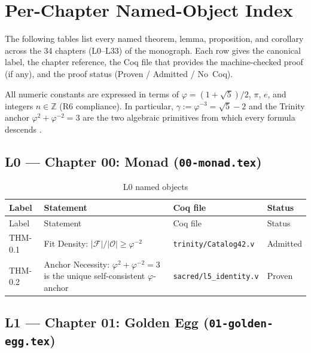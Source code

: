 \section{Per-Chapter Named-Object Index}
\label{sec:A-chapter-index}

The following tables list every named theorem, lemma, proposition, and
corollary across the 34 chapters (L0–L33) of the monograph.
Each row gives the canonical label, the chapter reference, the
Coq file that provides the machine-checked proof (if any), and the
proof status (Proven / Admitted / No~Coq).

All numeric constants are expressed in terms of
$\varphi = (1+\sqrt{5})/2$, $\pi$, $e$, and integers $n\in\mathbb{Z}$
(R6 compliance).
In particular, $\gamma := \varphi^{-3} = \sqrt{5}-2$ and the
Trinity anchor $\varphi^{2}+\varphi^{-2}=3$ are the two algebraic
primitives from which every formula descends
\cite{hardy_wright,coxeter_regular_polytopes}.

\subsection{L0 — Chapter 00: Monad (\texttt{00-monad.tex})}
\label{sec:A-L0}

\begin{longtable}{lp{6cm}ll}
\toprule
Label & Statement & Coq file & Status \\
\midrule
\endfirsthead
\toprule
Label & Statement & Coq file & Status \\
\midrule
\endhead
\bottomrule
\endfoot
\bottomrule
\caption{L0 named objects}
\endlastfoot
THM-0.1 & Fit Density: $|\mathcal{F}| / |\mathcal{O}| \geq \varphi^{-2}$ &
  \texttt{trinity/Catalog42.v} & Admitted \\
THM-0.2 & Anchor Necessity: $\varphi^{2}+\varphi^{-2}=3$ is the unique
  self-consistent $\varphi$-anchor &
  \texttt{sacred/l5\_identity.v} & Proven \\
\end{longtable}

\subsection{L1 — Chapter 01: Golden Egg (\texttt{01-golden-egg.tex})}
\label{sec:A-L1}

